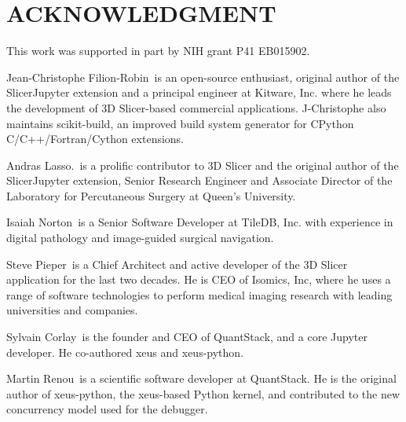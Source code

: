 \documentclass{IEEEcsmag}
\begin{document}
\section{ACKNOWLEDGMENT}

This work was supported in part by NIH grant P41 EB015902.

%

\begin{IEEEbiography}{Jean-Christophe Filion-Robin}{\,} is an open-source enthusiast, original author of the SlicerJupyter extension and a principal engineer at Kitware, Inc. where he leads the development of 3D Slicer-based commercial applications. J-Christophe also maintains scikit-build, an improved build system generator for CPython C/C++/Fortran/Cython extensions.
\end{IEEEbiography}

\begin{IEEEbiography}{Andras Lasso.}{\,} is a prolific contributor to 3D Slicer and the original author of the SlicerJupyter extension, Senior Research Engineer and Associate Director of the Laboratory for Percutaneous Surgery at Queen’s University.
\end{IEEEbiography}

\begin{IEEEbiography}{Isaiah Norton}{\,} is a Senior Software Developer at TileDB, Inc. with experience in digital pathology and image-guided surgical navigation.
\end{IEEEbiography}

\begin{IEEEbiography}{Steve Pieper}{\,} is a Chief Architect and active developer of the 3D Slicer application for the last two  decades. He is CEO of Isomics, Inc, where he uses a range of software technologies to perform medical imaging research with leading universities and companies.
\end{IEEEbiography}

\begin{IEEEbiography}{Sylvain Corlay}{\,} is the founder and CEO of QuantStack, and a core Jupyter developer. He co-authored xeus and xeus-python.
\end{IEEEbiography}

\begin{IEEEbiography}{Martin Renou}{\,} is a scientific software developer at QuantStack. He is the original author of xeus-python, the xeus-based Python kernel, and contributed to the new concurrency model used for the debugger.
\end{IEEEbiography}
\end{document}

